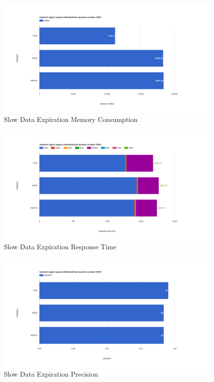 \begin{figure}[!htbp]
    \centering
    \includegraphics[width=\textwidth]{img/app3-ets-slow-m.png}
    \caption{Slow Data Expiration Memory Consumption}
\end{figure}
\begin{figure}[!htbp]
    \centering
    \includegraphics[width=\textwidth]{img/app3-ets-slow-r.png}
    \caption{Slow Data Expiration Response Time}
\end{figure}
\begin{figure}[!htbp]
    \centering
    \includegraphics[width=\textwidth]{img/app3-ets-slow-p.png}
    \caption{Slow Data Expiration Precision}
\end{figure}
